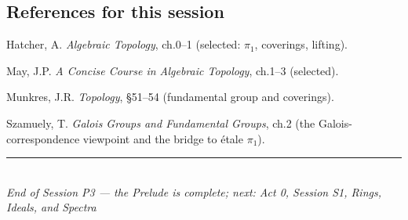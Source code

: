 \documentclass[11pt,a4paper]{article}
\theoremstyle{definition}
\begin{document}
	\subsection*{References for this session}
	\begin{enumerate}[label={[\arabic*]}]
		\item Hatcher, A. \emph{Algebraic Topology}, ch.0--1 (selected: $\pi_1$, coverings, lifting).
		\item May, J.P. \emph{A Concise Course in Algebraic Topology}, ch.1--3 (selected).
		\item Munkres, J.R. \emph{Topology}, \S51--54 (fundamental group and coverings).
		\item Szamuely, T. \emph{Galois Groups and Fundamental Groups}, ch.2 (the Galois-correspondence
		viewpoint and the bridge to \'etale $\pi_1$).
	\end{enumerate}
	
	\vspace{1.5em}
	\begin{center}
		\rule{0.6\textwidth}{0.4pt}\\[0.5em]
		\textit{End of Session P3 --- the Prelude is complete; next: Act 0, Session S1, Rings, Ideals, and Spectra}
	\end{center}
	
\end{document}
